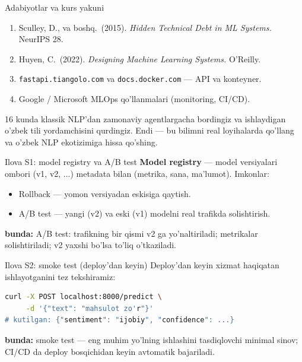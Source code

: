 \documentclass[aspectratio=169,11pt]{beamer}
\newcommand{\bunda}[1]{{\small\textbf{bunda:}\; #1}}
\begin{document}
\begin{frame}{Adabiyotlar va kurs yakuni}
  \begin{enumerate}\small\setlength\itemsep{4pt}
    \item Sculley, D., va boshq.\ (2015). \textit{Hidden Technical Debt in ML Systems.} NeurIPS 28.
    \item Huyen, C.\ (2022). \textit{Designing Machine Learning Systems.} O'Reilly.
    \item \texttt{fastapi.tiangolo.com} va \texttt{docs.docker.com} --- API va konteyner.
    \item Google / Microsoft MLOps qo'llanmalari (monitoring, CI/CD).
  \end{enumerate}
  \vspace{4pt}
  \begin{tcolorbox}[okbox,title=Tabriklaymiz!,top=2pt,bottom=2pt]
    \footnotesize
    16 kunda klassik NLP'dan zamonaviy agentlargacha bordingiz va ishlaydigan
    o'zbek tili yordamchisini qurdingiz. Endi --- bu bilimni real loyihalarda
    qo'llang va o'zbek NLP ekotizimiga hissa qo'shing.
  \end{tcolorbox}
\end{frame}

\appendix

\begin{frame}{Ilova S1: model registry va A/B test}
  \small
  \textbf{Model registry} --- model versiyalari ombori (v1, v2, ...) metadata bilan
  (metrika, sana, ma'lumot). Imkonlar:
  \begin{itemize}\setlength\itemsep{2pt}
    \item Rollback --- yomon versiyadan eskisiga qaytish.
    \item A/B test --- yangi (v2) va eski (v1) modelni real trafikda solishtirish.
  \end{itemize}
  \bunda{A/B test: trafikning bir qismi v2 ga yo'naltiriladi; metrikalar
  solishtiriladi; v2 yaxshi bo'lsa to'liq o'tkaziladi.}
\end{frame}

\begin{frame}[fragile]{Ilova S2: smoke test (deploy'dan keyin)}
  \small
  Deploy'dan keyin xizmat haqiqatan ishlayotganini tez tekshiramiz:
\begin{lstlisting}[language=bash]
curl -X POST localhost:8000/predict \
     -d '{"text": "mahsulot zo'r"}'
# kutilgan: {"sentiment": "ijobiy", "confidence": ...}
\end{lstlisting}
  \bunda{smoke test --- eng muhim yo'lning ishlashini tasdiqlovchi minimal
  sinov; CI/CD da deploy bosqichidan keyin avtomatik bajariladi.}
\end{frame}
\end{document}

